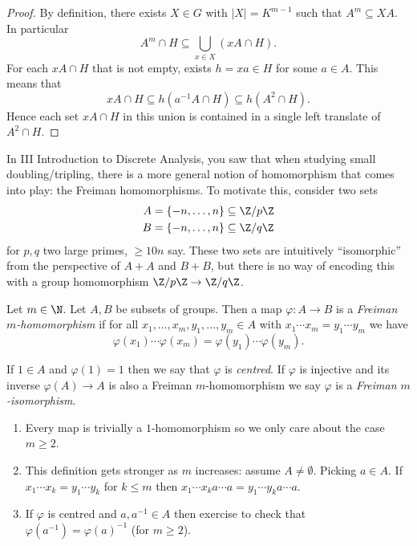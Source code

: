 \documentclass[a4paper]{article}
\begin{document}
\begin{proof}
  By definition, there exists \(X \in G\) with \(|X| = K^{m - 1}\) such that \(A^m \subseteq XA\). In particular
  \[
    A^m \cap H \subseteq \bigcup_{x \in X} (xA \cap H).
  \]
  For each \(xA \cap H\) that is not empty, exists \(h = xa \in H\) for some \(a \in A\). This means that
  \[
    xA \cap H \subseteq h(a^{-1}A \cap H) \subseteq h(A^2 \cap H).
  \]
  Hence each set \(xA \cap H\) in this union is contained in a single left translate of \(A^2 \cap H\).
\end{proof}

In III Introduction to Discrete Analysis, you saw that when studying small doubling/tripling, there is a more general notion of homomorphism that comes into play: the Freiman homomorphisms. To motivate this, consider two sets
\begin{align*}
  A &= \{-n, \dots, n\} \subseteq \Z/p\Z \\
  B &= \{-n, \dots, n\} \subseteq \Z/q\Z
\end{align*}
for \(p, q\) two large primes, \(\geq 10 n\) say. These two sets are intuitively ``isomorphic'' from the perspective of \(A + A\) and \(B + B\), but there is no way of encoding this with a group homomorphism \(\Z/p\Z \to \Z/q\Z\).

\begin{definition}
  Let \(m \in \N\). Let \(A, B\) be subsets of groups. Then a map \(\varphi: A \to B\) is a \emph{Freiman \(m\)-homomorphism} if for all \(x_1, \dots, x_m, y_1, \dots, y_m \in A\) with \(x_1\cdots x_m = y_1 \cdots y_m\) we have
  \[
    \varphi(x_1) \cdots \varphi(x_m) = \varphi(y_1) \cdots \varphi(y_m).
  \]

  If \(1 \in A\) and \(\varphi(1) = 1\) then we say that \(\varphi\) is \emph{centred}. If \(\varphi\) is injective and its inverse \(\varphi(A) \to A\) is also a Freiman \(m\)-homomorphism we say \(\varphi\) is a \emph{Freiman \(m\)-isomorphism}.
\end{definition}

\begin{remark}\leavevmode
  \begin{enumerate}
  \item Every map is trivially a \(1\)-homomorphism so we only care about the case \(m \geq 2\).
  \item This definition gets stronger as \(m\) increases: assume \(A \neq \emptyset\). Picking \(a \in A\). If \(x_1 \cdots x_k = y_1 \cdots y_k\) for \(k \leq m\) then \(x_1 \cdots x_k a \cdots a = y_1 \cdots y_k a \cdots a\).
  \item If \(\varphi\) is centred and \(a, a^{-1} \in A\) then exercise to check that \(\varphi(a^{-1}) = \varphi(a)^{-1}\) (for \(m \geq 2\)).
  \end{enumerate}
\end{remark}
\end{document}
